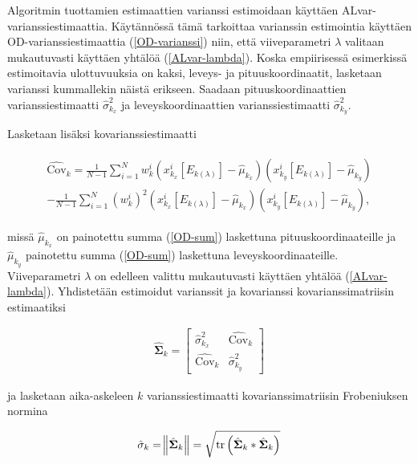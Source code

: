 \documentclass[
  12pt,
  a4paper, twoside]{book}
\begin{document}
Algoritmin tuottamien estimaattien varianssi estimoidaan käyttäen ALvar-varianssiestimaattia. Käytännössä tämä tarkoittaa varianssin estimointia käyttäen OD-varianssiestimaattia (\ref{OD-varianssi}) niin, että viiveparametri \(\lambda\) valitaan mukautuvasti käyttäen yhtälöä (\ref{ALvar-lambda}). Koska empiirisessä esimerkissä estimoitavia ulottuvuuksia on kaksi, leveys- ja pituuskoordinaatit, lasketaan varianssi kummallekin näistä erikseen. Saadaan pituuskoordinaattien varianssiestimaatti \(\hat{\sigma}^2_{k_x}\) ja leveyskoordinaattien varianssiestimaatti \(\hat{\sigma}^2_{k_y}\).

Lasketaan lisäksi kovarianssiestimaatti

\begin{align}\label{ALvar-kovarianssi}
\begin{split}
\hat{\text{Cov}}_k = \frac{1}{N-1} \sum_{i=1}^N w_k^i (x_{k_{x}}^i[E_{k(\lambda)}]-\hat{\mu}_{k_x})(x_{k_y}^i[E_{k(\lambda)}]-\hat{\mu}_{k_y}) \\ - \frac{1}{N-1} \sum_{i=1}^N (w_k^i)^2 (x_{k_{x}}^i[E_{k(\lambda)}]-\hat{\mu}_{k_x})(x_{k_y}^i[E_{k(\lambda)}]-\hat{\mu}_{k_y}),
\end{split}
\end{align}

\noindent missä \(\hat{\mu}_{k_x}\) on painotettu summa (\ref{OD-sum}) laskettuna pituuskoordinaateille ja \(\hat{\mu}_{k_y}\) painotettu summa (\ref{OD-sum}) laskettuna leveyskoordinaateille. Viiveparametri \(\lambda\) on edelleen valittu mukautuvasti käyttäen yhtälöä (\ref{ALvar-lambda}). Yhdistetään estimoidut varianssit ja kovarianssi kovarianssimatriisin estimaatiksi

\begin{align}\label{ALvar-kovarianssimatriisi}
\hat{\mathbf{\Sigma}}_k = \begin{bmatrix} \hat{\sigma}^2_{k_x} & \hat{\text{Cov}}_k \\ \hat{\text{Cov}}_k & \hat{\sigma}^2_{k_y} \end{bmatrix}
\end{align}

\noindent ja lasketaan aika-askeleen \(k\) varianssiestimaatti kovarianssimatriisin Frobeniuksen normina

\begin{align}\label{WB-varianssi}
\hat{\sigma}_k = \norm{ \hat{\mathbf{\Sigma}}_k } = \sqrt{ \text{tr}\left(\hat{\mathbf{\Sigma}}_k * \hat{\mathbf{\Sigma}}_k\right)}
\end{align}
\end{document}
